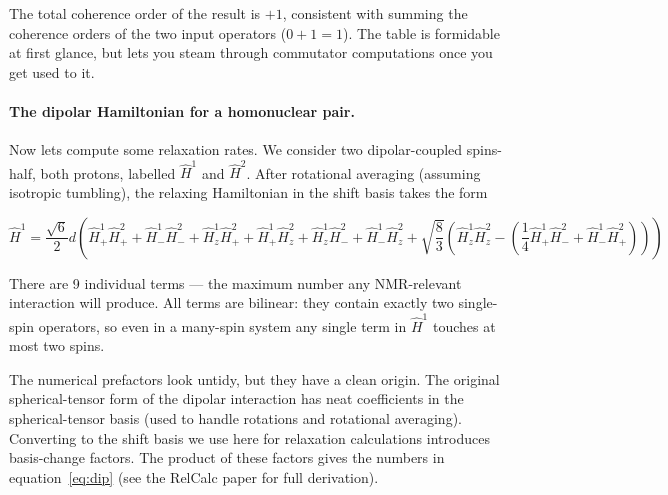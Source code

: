 \documentclass[notitlepage,11pt]{article}
\begin{document}
The total coherence order of the result is $+1$, consistent with summing the coherence orders of the two input operators ($0+1=1$). The table is formidable at first glance, but lets you steam through commutator computations once you get used to it.

\paragraph{The dipolar Hamiltonian for a homonuclear pair.} Now lets compute some relaxation rates. We consider two dipolar-coupled spins-half, both protons, labelled $\hat{H}^1$ and $\hat{H}^2$. After rotational averaging (assuming isotropic tumbling), the relaxing Hamiltonian in the shift basis takes the form

\begin{small}
\begin{equation}
\hat{H}^1 =  \frac{\sqrt{6}}{2} d\left( \hat{H}^1_+\hat{H}^2_+ + \hat{H}^1_-\hat{H}^2_-  + \hat{H}^1_z\hat{H}^2_+  + \hat{H}^1_+\hat{H}^2_z  + \hat{H}^1_z\hat{H}^2_-  + \hat{H}^1_-\hat{H}^2_z +  \sqrt{\frac{8}{3}}\left(\hat{H}^1_z\hat{H}^2_z  -\left(\frac{1}{4}\hat{H}^1_+\hat{H}^2_-  +\hat{H}^1_-\hat{H}^2_+\right)\right)\right)
\label{eq:dip2}
\end{equation}
\end{small}

There are 9 individual terms — the maximum number any NMR-relevant interaction will produce. All terms are bilinear: they contain exactly two single-spin operators, so even in a many-spin system any single term in $\hat{H}^1$ touches at most two spins.

The numerical prefactors look untidy, but they have a clean origin. The original spherical-tensor form of the dipolar interaction has neat coefficients in the spherical-tensor basis (used to handle rotations and rotational averaging). Converting to the shift basis we use here for relaxation calculations introduces basis-change factors. The product of these factors gives the numbers in equation~\ref{eq:dip} (see the RelCalc paper for full derivation).
\end{document}
